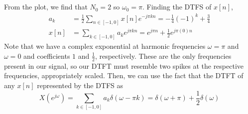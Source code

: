 \documentclass{article}
\begin{document}
\subsection{}

From the plot, we find that \(N_0 = 2\) so \(\omega_0 = \pi\).
Finding the DTFS of \(x[n]\),
\begin{align}
    a_k &= \frac{1}{2} \sum_{n \in [-1, 0]} x[n] e^{-j \pi k n} = -\frac{1}{4} (-1)^k + \frac{3}{4} \\
    x[n] &= \sum_{k \in [-1, 0]} a_k e^{j \pi k n} = e^{j \pi n} + \frac{1}{2} e^{j \pi (0) n}
\end{align}
Note that we have a complex exponential at harmonic frequencies \(\omega = \pi\) and \(\omega = 0\) and coefficients \(1\) and \(\frac{1}{2}\), respectively.
These are the only frequencies present in our signal, so our DTFT must resemble two spikes at the respective frequencies, appropriately scaled.
Then, we can use the fact that the DTFT of any \(x[n]\) represented by the DTFS as
\begin{equation}
    X(e^{j \omega}) = \sum_{k \in [-1, 0]} a_k \delta(\omega - \pi k) = \delta(\omega + \pi) + \frac{1}{2} \delta(\omega)
\end{equation}
\end{document}
